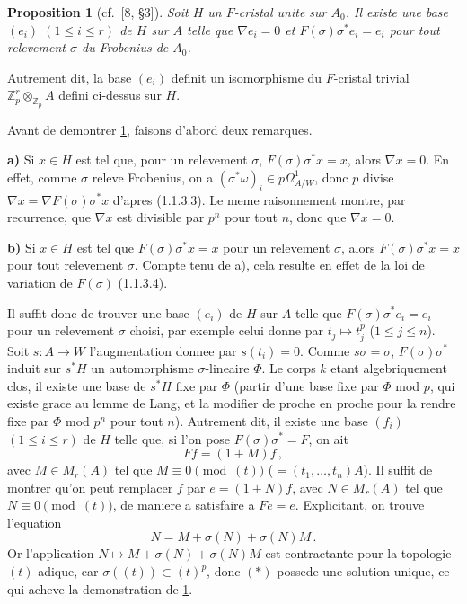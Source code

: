 \documentclass[12pt,a4paper]{article}
\theoremstyle{plain}
\newtheorem{proposition}[theorem]{Proposition}
\theoremstyle{definition}
\theoremstyle{remark}
\begin{document}
\begin{proposition}[{cf.\ [8, \S 3]}]\label{prop:1.2.2}
Soit $H$ un $F$-cristal unite sur $A_0$. Il existe une base $(e_i)$ $(1 \leq i \leq r)$ de $H$ sur $A$ telle que $\nabla e_i = 0$ et $F(\sigma)\sigma^*e_i = e_i$ pour tout relevement $\sigma$ du Frobenius de $A_0$.
\end{proposition}

Autrement dit, la base $(e_i)$ definit un isomorphisme du $F$-cristal trivial $\mathbb{Z}_p^r \otimes_{\mathbb{Z}_p} A$ defini ci-dessus sur $H$.

Avant de demontrer \ref{prop:1.2.2}, faisons d'abord deux remarques.

\textbf{a)} Si $x \in H$ est tel que, pour un relevement $\sigma$, $F(\sigma)\sigma^*x = x$, alors $\nabla x = 0$. En effet, comme $\sigma$ releve Frobenius, on a $(\sigma^*\omega)_i \in p\Omega^1_{A/W}$, donc $p$ divise $\nabla x = \nabla F(\sigma)\sigma^*x$ d'apres (1.1.3.3). Le meme raisonnement montre, par recurrence, que $\nabla x$ est divisible par $p^n$ pour tout $n$, donc que $\nabla x = 0$.

\textbf{b)} Si $x \in H$ est tel que $F(\sigma)\sigma^*x = x$ pour un relevement $\sigma$, alors $F(\sigma)\sigma^*x = x$ pour tout relevement $\sigma$. Compte tenu de a), cela resulte en effet de la loi de variation de $F(\sigma)$ (1.1.3.4).

Il suffit donc de trouver une base $(e_i)$ de $H$ sur $A$ telle que $F(\sigma)\sigma^*e_i = e_i$ pour un relevement $\sigma$ choisi, par exemple celui donne par $t_j \mapsto t_j^p$ ($1 \leq j \leq n$). Soit $s : A \to W$ l'augmentation donnee par $s(t_i) = 0$. Comme $s\sigma = \sigma$, $F(\sigma)\sigma^*$ induit sur $s^*H$ un automorphisme $\sigma$-lineaire $\Phi$. Le corps $k$ etant algebriquement clos, il existe une base de $s^*H$ fixe par $\Phi$ (partir d'une base fixe par $\Phi$ mod $p$, qui existe grace au lemme de Lang, et la modifier de proche en proche pour la rendre fixe par $\Phi$ mod $p^n$ pour tout $n$). Autrement dit, il existe une base $(f_i)$ $(1 \leq i \leq r)$ de $H$ telle que, si l'on pose $F(\sigma)\sigma^* = F$, on ait
\[
Ff = (1+M)f\,,
\]
avec $M \in M_r(A)$ tel que $M \equiv 0 \pmod{(t)}$ ($= (t_1, \ldots, t_n)A$). Il suffit de montrer qu'on peut remplacer $f$ par $e = (1+N)f$, avec $N \in M_r(A)$ tel que $N \equiv 0 \pmod{(t)}$, de maniere a satisfaire a $Fe = e$. Explicitant, on trouve l'equation
\begin{equation}\tag{$*$}
N = M + \sigma(N) + \sigma(N)M\,.
\end{equation}
Or l'application $N \mapsto M + \sigma(N) + \sigma(N)M$ est contractante pour la topologie $(t)$-adique, car $\sigma((t)) \subset (t)^p$, donc $(*)$ possede une solution unique, ce qui acheve la demonstration de \ref{prop:1.2.2}.
\end{document}
